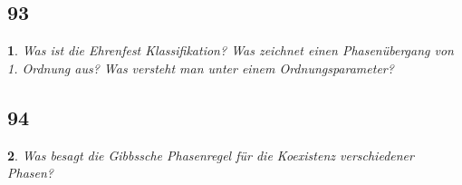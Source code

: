 \documentclass[12pt,a4paper]{report}
\newtheorem{myfrag}{}%
\begin{document}
\subsection{93}
\begin{myfrag}
Was ist die Ehrenfest Klassifikation? Was zeichnet einen Phasenübergang von 1.
Ordnung aus? Was versteht man unter einem Ordnungsparameter?
\end{myfrag}
\subsection{94}
\begin{myfrag}
Was besagt die Gibbssche Phasenregel für die Koexistenz verschiedener Phasen?
\end{myfrag}
\end{document}
